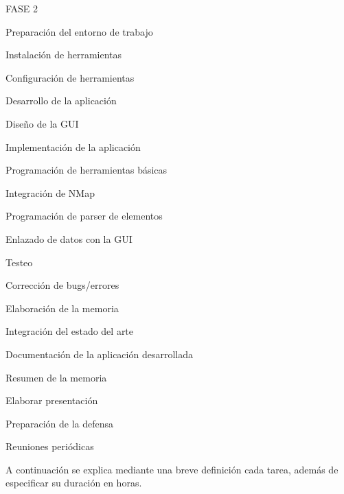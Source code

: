 \begin{numbered}
	\item FASE 2
	\begin{numbered}
		\item Preparación del entorno de trabajo
		\begin{numbered}
			\item Instalación de herramientas
			\item Configuración de herramientas
		\end{numbered}
		
		\item Desarrollo de la aplicación
		\begin{numbered}
			\item Diseño de la GUI
			\item Implementación de la aplicación
			\begin{numbered}
				\item Programación de herramientas básicas
				\item Integración de NMap
				\item Programación de parser de elementos
				\item Enlazado de datos con la GUI
			\end{numbered}
			\item Testeo
			\item Corrección de bugs/errores
		\end{numbered}
	\end{numbered}
	
	\item Elaboración de la memoria
	\begin{numbered}
		\item Integración del estado del arte
		\item Documentación de la aplicación desarrollada
		\item Resumen de la memoria
		\item Elaborar presentación
		\item Preparación de la defensa
	\end{numbered}
	
	\item Reuniones periódicas
\end{numbered}

A continuación se explica mediante una breve definición cada tarea, además de especificar su duración en horas.

